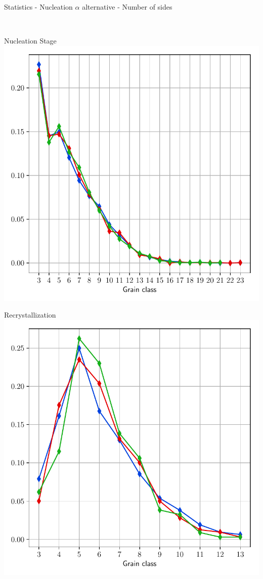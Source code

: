 \documentclass[usenames,dvipsnames]{beamer}
\begin{document}
\begin{frame}{Statistics - Nucleation $\alpha$ alternative - Number of sides}
\begin{minipage}{0.5\textwidth}
    \end{minipage}\\
    \begin{minipage}{0.5\textwidth}
    \centering
    \scriptsize
    Nucleation Stage
    \includegraphics[trim={0 1em 0 1.1em},clip=true,scale=0.335]{figures/stored_energy/SE/nsides/000110_nuclalternative_set.pdf}
    \end{minipage}%
    \begin{minipage}{0.5\textwidth}
    \centering
    \scriptsize
    Recrystallization
    \includegraphics[trim={0 1em 0 1.1em},clip=true,scale=0.335]{figures/stored_energy/SE/nsides/000240_nuclalternative_set.pdf}
    \end{minipage}
\end{frame}
\end{document}
